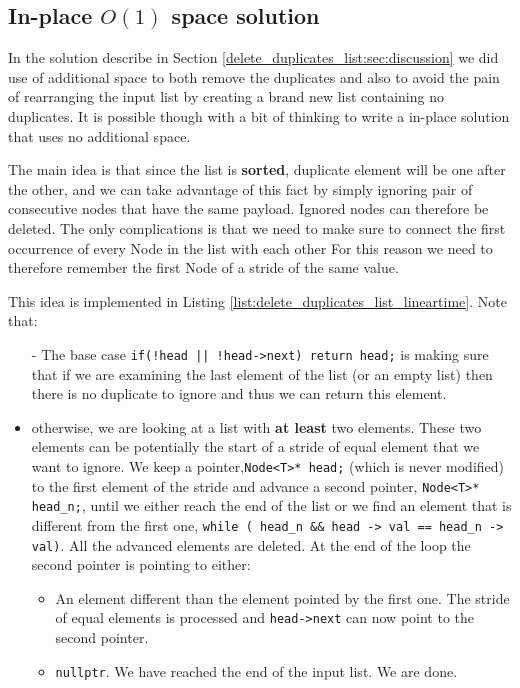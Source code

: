 \subsection{In-place $O(1)$ space solution}
\label{delete_duplicates_list:sec:linear_space}
In the solution describe in Section \ref{delete_duplicates_list:sec:discussion} we did use of additional space to both remove the duplicates and also to avoid the pain of rearranging the input list by creating a brand new list containing no duplicates. It is possible though with a bit of thinking to write a in-place solution that uses no additional space. 

The main idea is that since the list is \textbf{sorted}, duplicate element will be one after the other, and we can take advantage of this fact by simply ignoring pair of consecutive nodes that have the same payload. Ignored nodes can therefore be deleted. The only complications is that we need to make sure to connect the first occurrence of every Node in the list with each other For this reason we need to therefore remember the first Node of a stride of the same value.

This idea is implemented in Listing \ref{list:delete_duplicates_list_lineartime}. Note that:

\begin{itemize}
	\item[-] The base case \lstinline[columns=fixed]{if(!head || !head->next) return head;} is making sure that if we are examining the last element of the list (or an empty list) then there is no duplicate to ignore and thus we can return this element.
	\item[-] otherwise, we are looking at a list with \textbf{at least} two elements. These two elements can be potentially the start of a stride of equal element that we want to ignore. We keep a pointer,\lstinline[columns=fixed]{Node<T>* head;} (which is never modified) to the first element  of the stride and advance a second pointer, \lstinline[columns=fixed]{Node<T>* head_n;}, until we either reach the end of the list or we find an element that is different from the first one, \lstinline[columns=fixed]{while ( head_n && head -> val == head_n -> val)}. All the advanced elements are deleted. At the end of the loop the second pointer  is pointing to either:
	\begin{itemize}
		\item[-] An element different than the element pointed by the first one. The stride of equal elements is processed and  \lstinline[columns=fixed]{head->next} can now point to the second pointer.
		\item[-] \lstinline[columns=fixed]{nullptr}. We have reached the end of the input list. We are done.
	\end{itemize}
\end{itemize}


